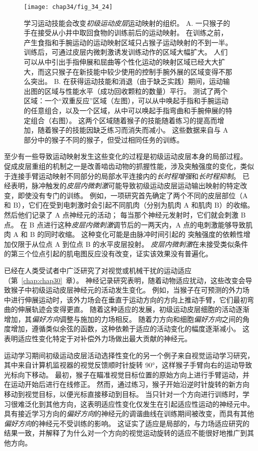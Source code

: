 \begin{figure}[htbp]
	\centering
	\texttt{[image: chap34/fig\_34\_24]}
	\caption{学习运动技能会改变\textit{初级运动皮层}运动映射的组织\cite{nudo1996use}。
		A. 一只猴子的手在接受从小井中取回食物的训练前后的运动映射。
		在训练之前，产生食指和手腕运动的运动映射区域只占猴子运动映射的不到一半。
		训练后，可通过皮层内微刺激诱发训练动作的区域大幅扩大。
		人们可以从中引出手指伸展和屈曲等个性化运动的映射区域已经大大扩大，而这只猴子在新技能中较少使用的控制手腕外展的区域变得不那么突出。
		B. 在获得运动技能和消退（由于缺乏实践）期间，运动输出图的区域与性能水平（成功回收颗粒的数量）平行。
		测试了两个区域：一个“双重反应”区域（左图），可以从中唤起手指和手腕运动的任意组合，以及一个区域，从中可以唤起手指弯曲和手腕伸展的特定组合（右图）。
		这两个区域随着猴子的技能随着练习的提高而增加，随着猴子的技能因缺乏练习而消失而减小。
		这些数据来自与 A 部分中的猴子不同的猴子，但受过相同任务的训练。}
	\label{fig:34_24}
\end{figure}


至少有一些导致运动映射发生这些变化的过程是初级运动皮层本身的局部过程。
促成皮层重组的机制之一是改善啮齿动物的抓握性能，涉及突触强度的变化，类似于连接手臂运动映射不同部分的局部水平连接内的\textit{长时程增强}和\textit{长时程抑制}。
已经表明，脉冲触发的\textit{皮层内微刺激}可能导致初级运动皮层运动输出映射的特定改变，即使没有专门的训练。
例如，一项研究首先确定了两个不同的皮层部位（A 和 B），它们在受到电刺激时会引起不同肌肉（分别为肌肉 A 和肌肉 B）的收缩。
然后他们记录了 A 点神经元的活动；
每当那个神经元发射时，它们就会刺激 B 点。
在 B 点进行这种\textit{皮层内微刺激}调节后的一两天内，A 点的电刺激能够导致肌肉 A 和 B 的同时收缩。
这种变化可能是由脉冲时间引起的 突触强度的依赖性增加仅限于从位点 A 到位点 B 的水平皮层投射。
\textit{皮层内微刺激}在未接受类似条件的第三个位点引起的肌电图反应没有改变，证实该效果没有普遍化。


已经在人类受试者中广泛研究了对视觉或机械干扰的运动适应（第~\ref{chap:chap30}~章）。
神经记录研究表明，随着动物适应扰动，这些改变会导致猴子中初级运动皮层神经元的活动发生变化。
例如，当猴子在可预测的外力场中进行伸展运动时，该外力场会在垂直于运动方向的方向上推动手臂，它们最初弯曲的伸展轨迹会变得更直。
随着这种适应的发展，初级运动皮层细胞的活动逐渐增加，其\textit{偏好方向}调整与施加的力场相反。
随着力方向和细胞\textit{偏好方向}之间的角度增加，遵循类似余弦的函数，这种依赖于适应的活动变化的幅度逐渐减小。
这表明适应性变化特定于对补偿外力场做出最大贡献的神经元。


运动学习期间初级运动皮层活动选择性变化的另一个例子来自视觉运动学习研究，其中来自计算机监视器的视觉反馈顺时针旋转 90°，这样猴子手臂向右的运动导致光标向下移动。
最初，猴子在瞄准视觉目标位置的原始方向上进行手臂运动，并在运动开始后进行在线修正。
然而，通过练习，猴子开始沿逆时针旋转的新方向移动到视觉目标，以便光标直接移动到目标。
当只针对一个方向进行训练时，学习很难泛化到其他方向，这表明适应性变化仅发生在引起适应性运动的神经元中。
具有接近学习方向的\textit{偏好方向}的神经元的调谐曲线在训练期间被改变，而具有其他\textit{偏好方向}的神经元不受训练的影响。
这证实了适应是局部的，与力场适应研究的结果一致，并解释了为什么对一个方向的视觉运动旋转的适应不能很好地推广到其他方向。


